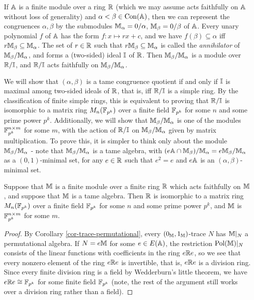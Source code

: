 \begin{appendices}
\begin{ex} If $\mathbb{A}$ is a finite module over a ring $\mathbb{R}$ (which we may assume acts faithfully on $\mathbb{A}$ without loss of generality) and $\alpha < \beta \in \operatorname{Con}(\mathbb{A})$, then we can represent the congruences $\alpha,\beta$ by the submodules $\mathbb{M}_\alpha = 0/\alpha$, $\mathbb{M}_\beta = 0/\beta$ of $\mathbb{A}$. Every unary polynomial $f$ of $\mathbb{A}$ has the form $f : x \mapsto rx + c$, and we have $f(\beta) \subseteq \alpha$ iff $r\mathbb{M}_\beta \subseteq \mathbb{M}_\alpha$. The set of $r \in \mathbb{R}$ such that $r \mathbb{M}_\beta \subseteq \mathbb{M}_\alpha$ is called the \emph{annihilator} of $\mathbb{M}_\beta/\mathbb{M}_\alpha$, and forms a (two-sided) ideal $\mathbb{I}$ of $\mathbb{R}$. Then $\mathbb{M}_\beta/\mathbb{M}_\alpha$ is a module over $\mathbb{R}/\mathbb{I}$, and $\mathbb{R}/\mathbb{I}$ acts faithfully on $\mathbb{M}_\beta/\mathbb{M}_\alpha$.

We will show that $(\alpha,\beta)$ is a tame congruence quotient if and only if $\mathbb{I}$ is maximal among two-sided ideals of $\mathbb{R}$, that is, iff $\mathbb{R}/\mathbb{I}$ is a simple ring. By the classification of finite simple rings, this is equivalent to proving that $\mathbb{R}/\mathbb{I}$ is isomorphic to a matrix ring $M_n(\mathbb{F}_{p^k})$ over a finite field $\mathbb{F}_{p^k}$ for some $n$ and some prime power $p^k$. Additionally, we will show that $\mathbb{M}_\beta/\mathbb{M}_\alpha$ is one of the modules $\mathbb{F}_{p^k}^{n\times m}$ for some $m$, with the action of $\mathbb{R}/\mathbb{I}$ on $\mathbb{M}_\beta/\mathbb{M}_\alpha$ given by matrix multiplication. To prove this, it is simpler to think only about the module $\mathbb{M}_\beta/\mathbb{M}_\alpha$ - note that $\mathbb{M}_\beta/\mathbb{M}_\alpha$ is a tame algebra, with $(e\mathbb{A}\cap \mathbb{M}_\beta)/\mathbb{M}_\alpha = e\mathbb{M}_\beta/\mathbb{M}_\alpha$ as a $(0,1)$-minimal set, for any $e \in \mathbb{R}$ such that $e^2 = e$ and $e\mathbb{A}$ is an $(\alpha,\beta)$-minimal set.
\end{ex}

\begin{prop} Suppose that $\mathbb{M}$ is a finite module over a finite ring $\mathbb{R}$ which acts faithfully on $\mathbb{M}$, and suppose that $\mathbb{M}$ is a tame algebra. Then $\mathbb{R}$ is isomorphic to a matrix ring $M_n(\mathbb{F}_{p^k})$ over a finite field $\mathbb{F}_{p^k}$ for some $n$ and some prime power $p^k$, and $\mathbb{M}$ is $\mathbb{F}_{p^k}^{n\times m}$ for some $m$.
\end{prop}
\begin{proof}
By Corollary \ref{cor-trace-permutational}, every $(0_{\mathbb{M}},1_{\mathbb{M}})$-trace $N$ has $\mathbb{M}|_N$ a permutational algebra. If $N = e\mathbb{M}$ for some $e \in E(\mathbb{A})$, the restriction $\operatorname{Pol}(\mathbb{M})|_N$ consists of the linear functions with coefficients in the ring $e\mathbb{R} e$, so we see that every nonzero element of the ring $e\mathbb{R} e$ is invertible, that is, $e\mathbb{R} e$ is a division ring. Since every finite division ring is a field by Wedderburn's little theorem, we have $e \mathbb{R} e \cong \mathbb{F}_{p^k}$ for some finite field $\mathbb{F}_{p^k}$ (note, the rest of the argument still works over a division ring rather than a field).


\end{proof}
\end{appendices}
